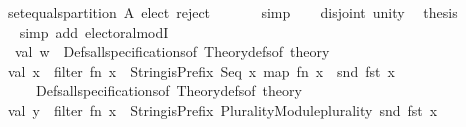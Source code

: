 \begin{isabellebody}
\ \ \ \ set{\isacharunderscore}{\kern0pt}equals{\isacharunderscore}{\kern0pt}partition\ A\ {\isacharparenleft}{\kern0pt}elect{\isacharcomma}{\kern0pt}\ reject{\isacharcomma}{\kern0pt}\ {\isacharbraceleft}{\kern0pt}{\isacharbraceright}{\kern0pt}{\isacharparenright}{\kern0pt}{\isachardoublequoteclose}\isanewline
\ \ \ \ \isamarkupfalse%
\ simp\isanewline
\ \ \isamarkupfalse%
\ disjoint\ unity\ \isamarkupfalse%
\ {\isacharquery}{\kern0pt}thesis\isanewline
\ \ \ \ \isamarkupfalse%
\ {\isacharparenleft}{\kern0pt}simp\ add{\isacharcolon}{\kern0pt}\ electoral{\isacharunderscore}{\kern0pt}modI{\isacharparenright}{\kern0pt}\isanewline
{}\isamarkupfalse%
%
\endisatagproof
{\isafoldproof}%
%
\isadelimproof
\isanewline
%
\endisadelimproof
%
\isadelimML
\isanewline
%
\endisadelimML
%
\isatagML
{}\isamarkupfalse%
\ {\isacartoucheopen}\isanewline
\ \ \ \ {\isacharparenleft}{\kern0pt}{\isacharasterisk}{\kern0pt}\ val\ w\ {\isacharequal}{\kern0pt}\ {\isacharparenleft}{\kern0pt}Defs{\isachardot}{\kern0pt}all{\isacharunderscore}{\kern0pt}specifications{\isacharunderscore}{\kern0pt}of\ {\isacharparenleft}{\kern0pt}Theory{\isachardot}{\kern0pt}defs{\isacharunderscore}{\kern0pt}of\ {\isacharat}{\kern0pt}{\isacharbraceleft}{\kern0pt}theory{\isacharbraceright}{\kern0pt}{\isacharparenright}{\kern0pt}{\isacharparenright}{\kern0pt}\isanewline
\ \ \ \ val\ x\ {\isacharequal}{\kern0pt}\ filter\ {\isacharparenleft}{\kern0pt}fn\ x\ {\isacharequal}{\kern0pt}{\isachargreater}{\kern0pt}\ String{\isachardot}{\kern0pt}isPrefix\ {\isachardoublequote}{\kern0pt}Seq{\isachardoublequote}{\kern0pt}\ x{\isacharparenright}{\kern0pt}\ {\isacharparenleft}{\kern0pt}map\ {\isacharparenleft}{\kern0pt}fn\ x\ {\isacharequal}{\kern0pt}{\isachargreater}{\kern0pt}\ snd\ {\isacharparenleft}{\kern0pt}fst\ x{\isacharparenright}{\kern0pt}{\isacharparenright}{\kern0pt}\isanewline
\ \ \ \ \ \ \ \ {\isacharparenleft}{\kern0pt}Defs{\isachardot}{\kern0pt}all{\isacharunderscore}{\kern0pt}specifications{\isacharunderscore}{\kern0pt}of\ {\isacharparenleft}{\kern0pt}Theory{\isachardot}{\kern0pt}defs{\isacharunderscore}{\kern0pt}of\ {\isacharat}{\kern0pt}{\isacharbraceleft}{\kern0pt}theory{\isacharbraceright}{\kern0pt}{\isacharparenright}{\kern0pt}{\isacharparenright}{\kern0pt}{\isacharparenright}{\kern0pt}\ {\isacharasterisk}{\kern0pt}{\isacharparenright}{\kern0pt}\isanewline
\ \ \ \ val\ y\ {\isacharequal}{\kern0pt}\ filter\ {\isacharparenleft}{\kern0pt}fn\ x\ {\isacharequal}{\kern0pt}{\isachargreater}{\kern0pt}\ {\isacharparenleft}{\kern0pt}String{\isachardot}{\kern0pt}isPrefix\ {\isacharparenleft}{\kern0pt}{\isachardoublequote}{\kern0pt}Plurality{\isacharunderscore}{\kern0pt}Module{\isachardot}{\kern0pt}plurality{\isachardoublequote}{\kern0pt}{\isacharparenright}{\kern0pt}\ {\isacharparenleft}{\kern0pt}snd\ {\isacharparenleft}{\kern0pt}fst\ {\isacharparenleft}{\kern0pt}x{\isacharparenright}{\kern0pt}{\isacharparenright}{\kern0pt}{\isacharparenright}{\kern0pt}{\isacharparenright}{\kern0pt}{\isacharparenright}{\kern0pt}\ \isanewline

\end{isabellebody}
